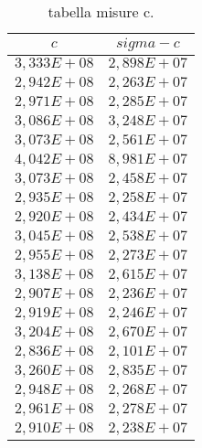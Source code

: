 \begin{table}[H]
    \centering
        \begin{tabular}{|c|c|}
        \hline
        $ c $ & $ sigma-c $\\
        \hline
        $ 3,333E+08 $ & $ 2,898E+07 $\\
        \hline
        $ 2,942E+08 $ & $ 2,263E+07 $\\
        \hline
        $ 2,971E+08 $ & $ 2,285E+07 $\\
        \hline
        $ 3,086E+08 $ & $ 3,248E+07 $\\
        \hline
        $ 3,073E+08 $ & $ 2,561E+07 $\\
        \hline
        $ 4,042E+08 $ & $ 8,981E+07 $\\
        \hline
        $ 3,073E+08 $ & $ 2,458E+07 $\\
        \hline
        $ 2,935E+08 $ & $ 2,258E+07 $\\
        \hline
        $ 2,920E+08 $ & $ 2,434E+07 $\\
        \hline
        $ 3,045E+08 $ & $ 2,538E+07 $\\
        \hline
        $ 2,955E+08 $ & $ 2,273E+07 $\\
        \hline
        $ 3,138E+08 $ & $ 2,615E+07 $\\
        \hline
        $ 2,907E+08 $ & $ 2,236E+07 $\\
        \hline
        $ 2,919E+08 $ & $ 2,246E+07 $\\
        \hline
        $ 3,204E+08 $ & $ 2,670E+07 $\\
        \hline
        $ 2,836E+08 $ & $ 2,101E+07 $\\
        \hline
        $ 3,260E+08 $ & $ 2,835E+07 $\\
        \hline
        $ 2,948E+08 $ & $ 2,268E+07 $\\
        \hline
        $ 2,961E+08 $ & $ 2,278E+07 $\\
        \hline
        $ 2,910E+08 $ & $ 2,238E+07 $\\
        \hline
        \end{tabular}
    \caption{tabella misure c.}
\end{table}
